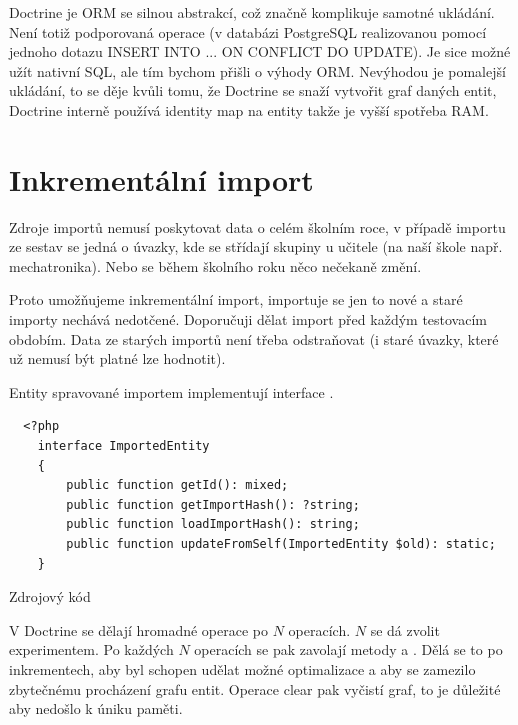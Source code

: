 Doctrine je ORM se silnou abstrakcí, což značně komplikuje samotné ukládání. Není totiž podporovaná operace (v databázi PostgreSQL realizovanou pomocí jednoho dotazu INSERT INTO ... ON CONFLICT DO UPDATE). Je sice možné užít nativní SQL, ale tím bychom přišli o výhody ORM.
Nevýhodou je pomalejší ukládání, to se děje kvůli tomu, že Doctrine se snaží vytvořit graf daných entit, Doctrine interně používá identity map na entity takže je vyšší spotřeba RAM.



\section{Inkrementální import}

Zdroje importů nemusí poskytovat data o celém školním roce, v případě importu ze sestav se jedná o úvazky, kde se střídají skupiny u učitele (na naší škole např. mechatronika).
 Nebo se během školního roku něco nečekaně změní.

Proto umožňujeme inkrementální import, importuje se jen to nové a staré importy nechává nedotčené. Doporučuji dělat import před každým testovacím obdobím. Data ze starých importů není třeba odstraňovat (i staré úvazky, které už nemusí být platné lze hodnotit). 

Entity spravované importem implementují interface .

\begin{code}[H]
\begin{verbatim}
  <?php
    interface ImportedEntity
    {
        public function getId(): mixed;
        public function getImportHash(): ?string;   
        public function loadImportHash(): string;   
        public function updateFromSelf(ImportedEntity $old): static;
    }
\end{verbatim}
\caption{Zdrojový kód }
\end{code}

V Doctrine se dělají hromadné operace po $N$ operacích. $N$ se dá zvolit experimentem.
Po každých $N$ operacích se pak zavolají metody  a . Dělá se to po inkrementech, aby  byl schopen udělat možné optimalizace a aby se zamezilo zbytečnému procházení grafu entit. Operace clear pak vyčistí graf, to je důležité aby nedošlo k úniku paměti.

